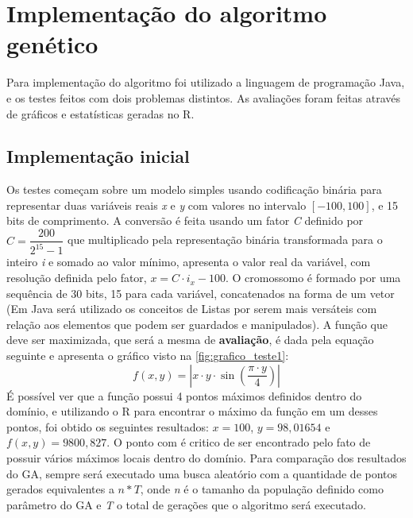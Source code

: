 
\chapter{Implementação do algoritmo genético}
\label{chap:implementGA}

Para implementação do algoritmo foi utilizado a linguagem de programação Java, e os testes feitos com dois problemas distintos. As avaliações foram feitas através de gráficos e estatísticas geradas no R.

\section{Implementação inicial}
Os testes começam sobre um modelo simples usando codificação binária para representar duas variáveis reais \textit{x} e \textit{y} com valores no intervalo \([-100,100]\), e 15 bits de comprimento. A conversão é feita usando um fator \textit{C} definido por \(C = \dfrac{200}{2^{15} - 1}\) que multiplicado pela representação binária transformada para o inteiro \textit{i} e somado ao valor mínimo, apresenta o valor real da variável, com resolução definida pelo fator,
\(x = C \cdot i_x - 100\). O cromossomo é formado por uma sequência de 30 bits, 15 para cada variável, concatenados na forma de um vetor (Em Java será utilizado os conceitos de Listas por serem mais versáteis com relação aos elementos que podem ser guardados e manipulados). A função que deve ser maximizada, que será a mesma de \textbf{avaliação}, é dada pela equação seguinte e apresenta o gráfico visto na \autoref{fig:grafico_teste1}: 
\[f(x,y) = \left| x \cdot y \cdot \sin\left(\frac{\pi \cdot y}{4}\right) \right|\] 
É possível ver que a função possui 4 pontos máximos definidos dentro do domínio, e utilizando o R para encontrar o máximo da função em um desses pontos, foi obtido os seguintes resultados: \(x = 100\), \(y = 98,01654\) e \(f(x,y) = 9800,827\). O ponto com é critico de ser encontrado pelo fato de possuir vários máximos locais dentro do domínio. Para comparação dos resultados do GA, sempre será executado uma busca aleatório com a quantidade de pontos gerados equivalentes a \(n * T\), onde \textit{n} é o tamanho da população definido como parâmetro do GA e \textit{T} o total de gerações que o algoritmo será executado.


